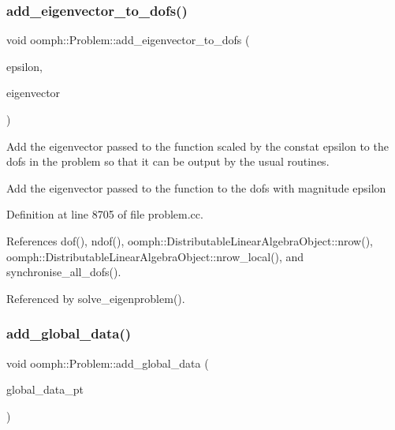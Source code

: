 \mbox{\label{classoomph_1_1Problem_aa803fbccb2c8c70702b2c39837e7ad2e}} 
\subsubsection{\texorpdfstring{add\+\_\+eigenvector\+\_\+to\+\_\+dofs()}{add\_eigenvector\_to\_dofs()}}
{\footnotesize\ttfamily void oomph\+::\+Problem\+::add\+\_\+eigenvector\+\_\+to\+\_\+dofs (\begin{DoxyParamCaption}\item[{const double \&}]{epsilon,  }\item[{const \hyperlink{classoomph_1_1DoubleVector}{Double\+Vector} \&}]{eigenvector }\end{DoxyParamCaption})}



Add the eigenvector passed to the function scaled by the constat epsilon to the dofs in the problem so that it can be output by the usual routines. 

Add the eigenvector passed to the function to the dofs with magnitude epsilon 

Definition at line 8705 of file problem.\+cc.



References dof(), ndof(), oomph\+::\+Distributable\+Linear\+Algebra\+Object\+::nrow(), oomph\+::\+Distributable\+Linear\+Algebra\+Object\+::nrow\+\_\+local(), and synchronise\+\_\+all\+\_\+dofs().



Referenced by solve\+\_\+eigenproblem().

\mbox{\label{classoomph_1_1Problem_a6f0c24728351d390d4f0a86d07bd8678}} 
\subsubsection{\texorpdfstring{add\+\_\+global\+\_\+data()}{add\_global\_data()}}
{\footnotesize\ttfamily void oomph\+::\+Problem\+::add\+\_\+global\+\_\+data (\begin{DoxyParamCaption}\item[{\hyperlink{classoomph_1_1Data}{Data} $\ast$const \&}]{global\+\_\+data\+\_\+pt }\end{DoxyParamCaption})\hspace{0.3cm}{\ttfamily [inline]}}



